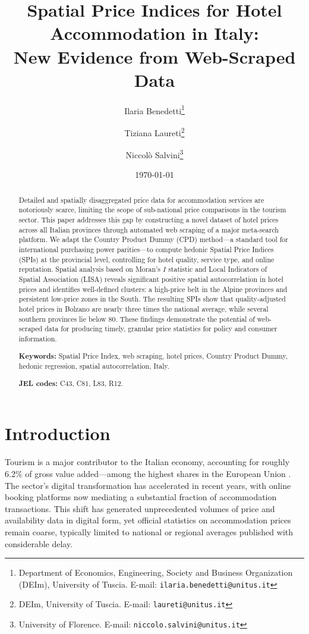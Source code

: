 \documentclass[12pt,a4paper]{article}
\title{\textbf{Spatial Price Indices for Hotel Accommodation in Italy:\\New Evidence from Web-Scraped Data}}
\author{
    Ilaria Benedetti\thanks{Department of Economics, Engineering, Society and Business Organization (DEIm), University of Tuscia. E-mail: \texttt{ilaria.benedetti@unitus.it}} \and
    Tiziana Laureti\thanks{DEIm, University of Tuscia. E-mail: \texttt{laureti@unitus.it}} \and
    Niccolò Salvini\thanks{University of Florence. E-mail: \texttt{niccolo.salvini@unitus.it}}
}
\date{\today}
\begin{document}
\maketitle

\begin{abstract}
Detailed and spatially disaggregated price data for accommodation services are notoriously scarce, limiting the scope of sub-national price comparisons in the tourism sector. This paper addresses this gap by constructing a novel dataset of hotel prices across all Italian provinces through automated web scraping of a major meta-search platform. We adapt the Country Product Dummy (CPD) method---a standard tool for international purchasing power parities---to compute hedonic Spatial Price Indices (SPIs) at the provincial level, controlling for hotel quality, service type, and online reputation. Spatial analysis based on Moran's $I$ statistic and Local Indicators of Spatial Association (LISA) reveals significant positive spatial autocorrelation in hotel prices and identifies well-defined clusters: a high-price belt in the Alpine provinces and persistent low-price zones in the South. The resulting SPIs show that quality-adjusted hotel prices in Bolzano are nearly three times the national average, while several southern provinces lie below 80. These findings demonstrate the potential of web-scraped data for producing timely, granular price statistics for policy and consumer information.

\medskip
\noindent \textbf{Keywords:} Spatial Price Index, web scraping, hotel prices, Country Product Dummy, hedonic regression, spatial autocorrelation, Italy.

\medskip
\noindent \textbf{JEL codes:} C43, C81, L83, R12.
\end{abstract}

\section{Introduction}
\label{sec:introduction}

Tourism is a major contributor to the Italian economy, accounting for roughly 6.2\% of gross value added---among the highest shares in the European Union \citep{eurostat2023tsa}. The sector's digital transformation has accelerated in recent years, with online booking platforms now mediating a substantial fraction of accommodation transactions. This shift has generated unprecedented volumes of price and availability data in digital form, yet official statistics on accommodation prices remain coarse, typically limited to national or regional averages published with considerable delay.
\end{document}

